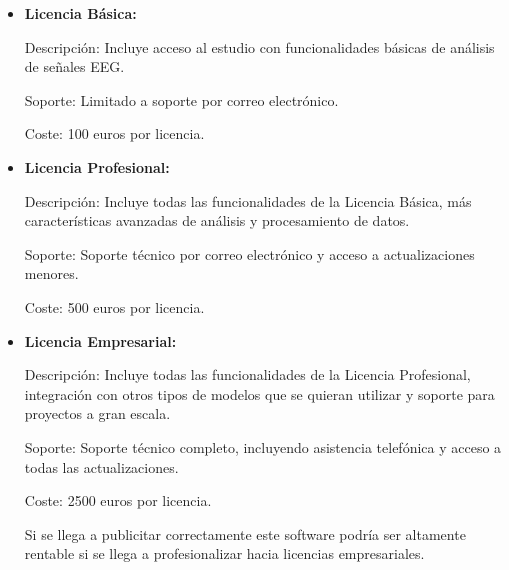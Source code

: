 \begin{itemize}

  \item
   \textbf{Licencia Básica:}

Descripción: Incluye acceso al estudio con funcionalidades básicas de análisis de señales EEG.

Soporte: Limitado a soporte por correo electrónico.

Coste: 100 euros por licencia.


  \item
   \textbf{Licencia Profesional:}


Descripción: Incluye todas las funcionalidades de la Licencia Básica, más características avanzadas de análisis y procesamiento de datos.

Soporte: Soporte técnico por correo electrónico y acceso a actualizaciones menores.

Coste: 500 euros por licencia.


  \item
   \textbf{Licencia Empresarial:}

Descripción: Incluye todas las funcionalidades de la Licencia Profesional, integración con otros tipos de modelos que se quieran utilizar y soporte para proyectos a gran escala.

Soporte: Soporte técnico completo, incluyendo asistencia telefónica y acceso a todas las actualizaciones.

Coste: 2500 euros por licencia.


Si se llega a publicitar correctamente este software podría ser altamente rentable si se llega a profesionalizar hacia licencias empresariales.

\end{itemize}